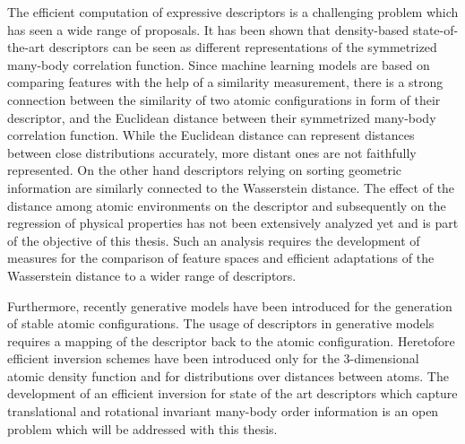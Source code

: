 
The efficient computation of expressive descriptors is a challenging problem
which has seen a wide range of proposals\cite{behler2011atom, rupp2012fast,
bartok2013representing, huo2017unified}.  It has been shown that
density-based state-of-the-art descriptors can be seen as different
representations of the symmetrized many-body correlation
function\cite{willatt2019atom}.
Since machine learning models are based on comparing features with the help of
a similarity measurement, there is a strong connection between the similarity
of two atomic configurations in form of their descriptor, and the Euclidean
distance between their symmetrized many-body correlation function.
While the Euclidean distance can represent distances between close
distributions accurately, more distant ones are not faithfully represented.  On
the other hand descriptors relying on sorting geometric
information\cite{rupp2012fast, gallet2013structural} are similarly connected to
the Wasserstein distance\cite{rowland2019orthogonal}.  The effect of the
distance among atomic environments on the descriptor and subsequently on the
regression of physical properties has not been extensively analyzed yet and is
part of the objective of this thesis.  Such an analysis requires the
development of measures for the comparison of feature spaces and efficient
adaptations of the Wasserstein distance to a wider range of descriptors.

Furthermore, recently generative models have been introduced for the generation
of stable atomic configurations\cite{Sanchez-Lengeling360, gebauer2019symmetry,
noe2019boltzmann, hoffmann2019data}.  The usage of descriptors in generative
models requires a mapping of the descriptor back to the atomic configuration.
Heretofore efficient inversion schemes have been introduced only for the
3-dimensional atomic density function\cite{Sanchez-Lengeling360} and for
distributions over distances between atoms\cite{gebauer2019symmetry}.  The
development of an efficient inversion for state of the art descriptors which
capture translational and rotational invariant many-body order information is
an open problem which will be addressed with this thesis.



